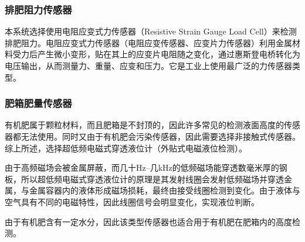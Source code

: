 \subsubsection{排肥阻力传感器}

本系统选择使用电阻应变式力传感器（Resistive Strain Gauge Load Cell）来检测排肥阻力。电阻应变式力传感器（电阻应变传感器、应变片力传感器）利用金属材料受力后产生微小变形，贴在其上的应变片电阻随之变化，通过惠斯登电桥转化为电压输出，从而测量力、重量、应变和压力。它是工业上使用最广泛的力传感器类型。

\subsubsection{肥箱肥量传感器}

有机肥属于颗粒材料，而且肥箱是不封顶的，因此许多常见的检测液面高度的传感器都无法使用。同时又由于有机肥会污染传感器，因此需要选择非接触式传感器。综上所述，选择超低频电磁式穿透液位计（外贴式电磁液位检测）。

由于高频磁场会被金属屏蔽，而几十Hz--几kHz的低频磁场能穿透数毫米厚的钢板，所以超低频电磁式穿透液位计的原理是其发射线圈会发射低频磁场并穿透金属，与金属容器内的液体形成磁场损耗，最终由接受线圈检测到变化。由于液体与空气具有不同的电磁特性，因此线圈信号会明显变化，实现液位判断。

由于有机肥含有一定水分，因此该类型传感器也适合用于有机肥在肥箱内的高度检测。

